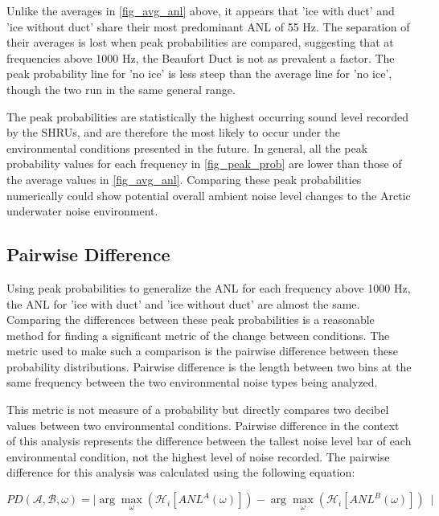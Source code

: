Unlike the averages in \autoref{fig_avg_anl} above, it appears that 'ice with duct' and 'ice without duct' share their most predominant ANL of 55 Hz. The separation of their averages is lost when peak probabilities are compared, suggesting that at frequencies above 1000 Hz, the Beaufort Duct is not as prevalent a factor. The peak probability line for 'no ice' is less steep than the average line for 'no ice', though the two run in the same general range. 

The peak probabilities are statistically the highest occurring sound level recorded by the SHRUs, and are therefore the most likely to occur under the environmental conditions presented in the future. In general, all the peak probability values for each frequency in \autoref{fig_peak_prob} are lower than those of the average values in \autoref{fig_avg_anl}. Comparing these peak probabilities numerically could show potential overall ambient noise level changes to the Arctic underwater noise environment.  


\subsection{Pairwise Difference} \label{sec_pairdiff}

Using peak probabilities to generalize the ANL for each frequency above 1000 Hz, the ANL for 'ice with duct' and 'ice without duct' are almost the same. Comparing the differences between these peak probabilities is a reasonable method for finding a significant metric of the change between conditions. The metric used to make such a comparison is the pairwise difference between these probability distributions. Pairwise difference is the length between two bins at the same frequency between the two environmental noise types being analyzed. 

This metric is not measure of a probability but directly compares two decibel values between two environmental conditions. Pairwise difference in the context of this analysis represents the difference between the tallest noise level bar of each environmental condition, not the highest level of noise recorded. The pairwise difference for this analysis was calculated using the following equation:

\begin{equation}
PD(\mathcal{A},\mathcal{B},\omega)=\mid \arg \max_{\omega} (\mathcal{H}_{i} [ANL ^{A}(\omega)])- \arg\max_{\omega}(\mathcal{H}_{i} [ANL^{B}(\omega)])\ \mid 	%
\end{equation}

